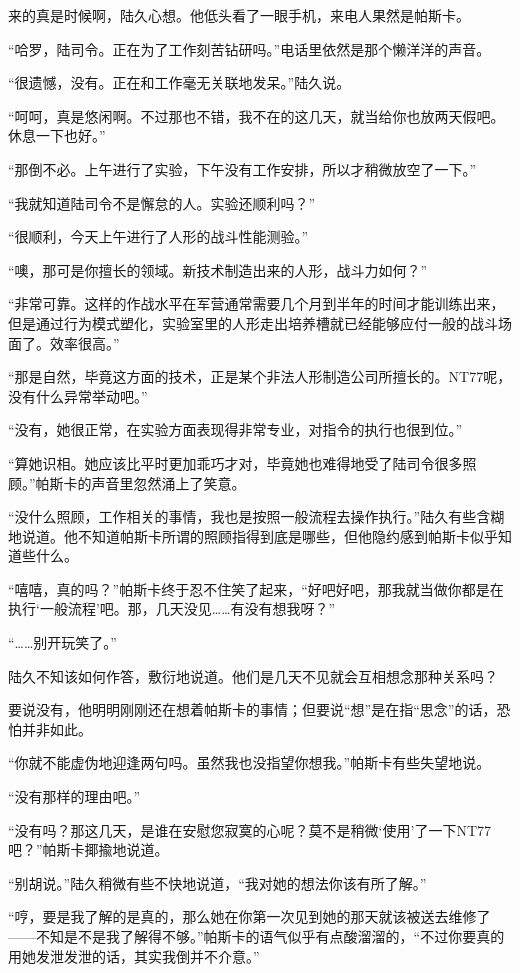 来的真是时候啊，陆久心想。他低头看了一眼手机，来电人果然是帕斯卡。

“哈罗，陆司令。正在为了工作刻苦钻研吗。”电话里依然是那个懒洋洋的声音。

“很遗憾，没有。正在和工作毫无关联地发呆。”陆久说。

“呵呵，真是悠闲啊。不过那也不错，我不在的这几天，就当给你也放两天假吧。休息一下也好。”

“那倒不必。上午进行了实验，下午没有工作安排，所以才稍微放空了一下。”

“我就知道陆司令不是懈怠的人。实验还顺利吗？”

“很顺利，今天上午进行了人形的战斗性能测验。”

“噢，那可是你擅长的领域。新技术制造出来的人形，战斗力如何？”

“非常可靠。这样的作战水平在军营通常需要几个月到半年的时间才能训练出来，但是通过行为模式塑化，实验室里的人形走出培养槽就已经能够应付一般的战斗场面了。效率很高。”

“那是自然，毕竟这方面的技术，正是某个非法人形制造公司所擅长的。NT77呢，没有什么异常举动吧。”

“没有，她很正常，在实验方面表现得非常专业，对指令的执行也很到位。”

“算她识相。她应该比平时更加乖巧才对，毕竟她也难得地受了陆司令很多照顾。”帕斯卡的声音里忽然涌上了笑意。

“没什么照顾，工作相关的事情，我也是按照一般流程去操作执行。”陆久有些含糊地说道。他不知道帕斯卡所谓的照顾指得到底是哪些，但他隐约感到帕斯卡似乎知道些什么。

“嘻嘻，真的吗？”帕斯卡终于忍不住笑了起来，“好吧好吧，那我就当做你都是在执行‘一般流程’吧。那，几天没见……有没有想我呀？”

“……别开玩笑了。” 

陆久不知该如何作答，敷衍地说道。他们是几天不见就会互相想念那种关系吗？

要说没有，他明明刚刚还在想着帕斯卡的事情；但要说“想”是在指“思念”的话，恐怕并非如此。

“你就不能虚伪地迎逢两句吗。虽然我也没指望你想我。”帕斯卡有些失望地说。

“没有那样的理由吧。”

“没有吗？那这几天，是谁在安慰您寂寞的心呢？莫不是稍微‘使用’了一下NT77吧？”帕斯卡揶揄地说道。

“别胡说。”陆久稍微有些不快地说道，“我对她的想法你该有所了解。”

“哼，要是我了解的是真的，那么她在你第一次见到她的那天就该被送去维修了——不知是不是我了解得不够。”帕斯卡的语气似乎有点酸溜溜的，“不过你要真的用她发泄发泄的话，其实我倒并不介意。”

